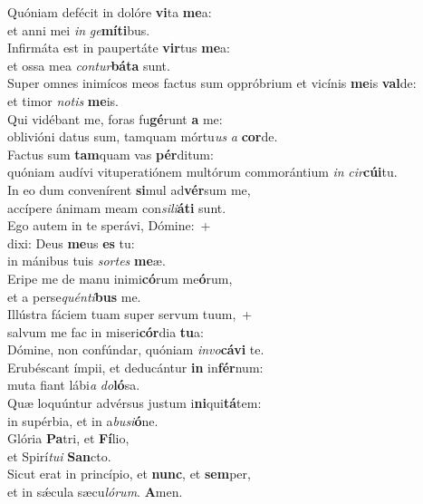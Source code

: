 \evenverse Quóniam defécit in dolóre \textbf{vi}ta \textbf{me}a:~\*\\
\evenverse et anni mei \textit{in} \textit{ge}\textbf{mí}\textbf{ti}bus.\\
\oddverse Infirmáta est in paupertáte \textbf{vir}tus \textbf{me}a:~\*\\
\oddverse et ossa mea \textit{con}\textit{tur}\textbf{bá}\textbf{ta} sunt.\\
\evenverse Super omnes inimícos meos factus sum oppróbrium et vicínis \textbf{me}is \textbf{val}de:~\*\\
\evenverse et timor \textit{no}\textit{tis} \textbf{me}is.\\
\oddverse Qui vidébant me, foras fu\textbf{gé}runt \textbf{a} me:~\*\\
\oddverse oblivióni datus sum, tamquam mórtu\textit{us} \textit{a} \textbf{cor}de.\\
\evenverse Factus sum \textbf{tam}quam vas \textbf{pér}ditum:~\*\\
\evenverse quóniam audívi vituperatiónem multórum commorántium \textit{in} \textit{cir}\textbf{cú}\textbf{i}tu.\\
\oddverse In eo dum convenírent \textbf{si}mul ad\textbf{vér}sum me,~\*\\
\oddverse accípere ánimam meam con\textit{si}\textit{li}\textbf{á}\textbf{ti} sunt.\\
\evenverse Ego autem in te sperávi, Dómine:~+\\
\evenverse  dixi: Deus \textbf{me}us \textbf{es} tu:~\*\\
\evenverse in mánibus tuis \textit{sor}\textit{tes} \textbf{me}æ.\\
\oddverse Eripe me de manu inimi\textbf{có}rum me\textbf{ó}rum,~\*\\
\oddverse et a perse\textit{quén}\textit{ti}\textbf{bus} me.\\
\evenverse Illústra fáciem tuam super servum tuum,~+\\
\evenverse  salvum me fac in miseri\textbf{cór}dia \textbf{tu}a:~\*\\
\evenverse Dómine, non confúndar, quóniam \textit{in}\textit{vo}\textbf{cá}\textbf{vi} te.\\
\oddverse Erubéscant ímpii, et deducántur \textbf{in} in\textbf{fér}num:~\*\\
\oddverse muta fiant lábi\textit{a} \textit{do}\textbf{ló}sa.\\
\evenverse Quæ loquúntur advérsus justum i\textbf{ni}qui\textbf{tá}tem:~\*\\
\evenverse in supérbia, et in a\textit{bu}\textit{si}\textbf{ó}ne.\\
\oddverse Glória \textbf{Pa}tri, et \textbf{Fí}lio,~\*\\
\oddverse et Spirí\textit{tu}\textit{i} \textbf{San}cto.\\
\evenverse Sicut erat in princípio, et \textbf{nunc}, et \textbf{sem}per,~\*\\
\evenverse et in sǽcula sæcu\textit{ló}\textit{rum}. \textbf{A}men.\\
